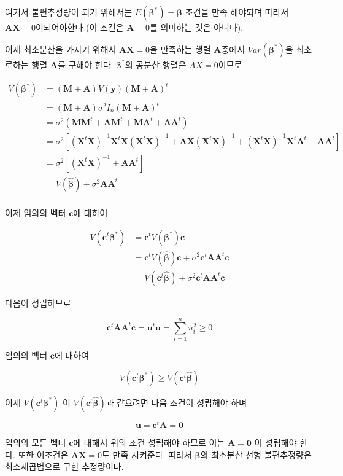 \documentclass[
  11pt,
  a4paper,
  oneside]{scrbook}
\theoremstyle{definition}
\theoremstyle{plain}
\theoremstyle{definition}
\theoremstyle{definition}
\theoremstyle{remark}
\begin{document}
여기서 불편추정량이 되기 위해서는 \(E( \pmb \beta^*)= \pmb \beta\)
조건을 만족 해야되며 따라서 \(\pmb A \pmb X=0\)이되어야한다 (이 조건은
\(\pmb A=0\)를 의미하는 것은 아니다).

이제 최소분산을 가지기 위해서 \(\pmb A \pmb X=0\)을 만족하는 행렬
\(\pmb A\)중에서 \(Var( \pmb \beta^*)\)을 최소로하는 행렬 \(\pmb A\)를
구해야 한다. \(\pmb \beta^*\)의 공분산 행렬은 \(AX=0\)이므로

\[
\begin{align}
 V( \pmb \beta^*) & = ( \pmb M+ \pmb A)V( \pmb y)( \pmb M+ \pmb A)^t\\
            & = ( \pmb M+ \pmb A)\sigma^2 I_n( \pmb M+ \pmb A)^t\\
            & = \sigma^2 ( \pmb M \pmb M^t+ \pmb A \pmb M^t+ \pmb M  \pmb A^t+ \pmb A  \pmb A^t)\\
            & = \sigma^2 [ ( \pmb X^t  \pmb X)^{-1}  \pmb X^t  \pmb X( \pmb X^t \pmb X)^{-1} + \pmb A  \pmb X ( \pmb X^t  \pmb X)^{-1}+( \pmb X^t  \pmb X)^{-1} \pmb X^t  \pmb A^t+  \pmb A  \pmb A^t ]\\
            & = \sigma^2[( \pmb X^t  \pmb X)^{-1} +  \pmb A  \pmb A^t ]  \\
            & = V( \hat {\pmb \beta} ) + \sigma^2 \pmb A \pmb A^t\\
\end{align}
\]

이제 임의의 벡터 \(\pmb c\)에 대하여

\[
\begin{align}
 V( \pmb c^t \pmb \beta^*)  & = \pmb c^t V (\pmb \beta^*) \pmb c \\
   & =  \pmb c^t V( \hat {\pmb \beta} ) \pmb c + \sigma^2 \pmb c^t \pmb A \pmb A^t \pmb c \\
    & =  V( \pmb c^t  \hat {\pmb \beta} ) + \sigma^2 \pmb c^t \pmb A \pmb A^t \pmb c 
\end{align}
\]

다음이 성립하므로

\[ \pmb c^t \pmb A \pmb A^t \pmb c = \pmb u^t \pmb u = \sum_{i=1}^n u_i^2 \ge 0 \]

임의의 벡터 \(\pmb c\)에 대하여

\[ V( \pmb c^t \pmb \beta^*) \ge  V( \pmb c^t  \hat {\pmb \beta} ) \]

이제 \(V( \pmb c^t \pmb \beta^*)\) 이
\(V( \pmb c^t \hat {\pmb \beta} )\)과 같으려면 다음 조건이 성립해야 하며

\[ \pmb u = \pmb c^t \pmb A = \pmb 0 \]

임의의 모든 벡터 \(\pmb c\)에 대해서 위의 조건 성립해야 하므로 이는
\(\pmb A = \pmb 0\) 이 성립해야 한다. 또한 이조건은
\(\pmb A \pmb X=0\)도 만족 시켜준다. 따라서 \(\pmb \beta\)의 최소분산
선형 불편추정량은 최소제곱법으로 구한 추정량이다.
\end{document}
